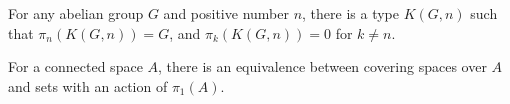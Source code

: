 \begin{thm}\label{Eilenberg-Mac-Lane-Spaces}
For any abelian group $G$ and positive number $n$, there is a type
$K(G,n)$ such that $\pi_n(K(G,n)) = G$, and  $\pi_k(K(G,n)) = 0$
for $k\neq n$.
\end{thm}

\begin{thm}\label{thm:covering-spaces}
  For a connected space $A$, there is an equivalence between covering spaces over $A$ and sets with an action of $\pi_1(A)$.
\end{thm}


\sectionNotes


